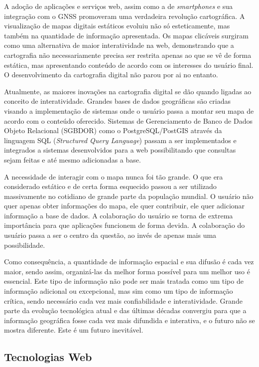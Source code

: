 		A adoção de aplicações e serviços web, assim como a de \textit{smartphones} e sua integração com o GNSS promoveram uma verdadeira revolução cartográfica. A visualização de mapas digitais estáticos evoluiu não só esteticamente, mas também na quantidade de informação apresentada. Os mapas clicáveis surgiram como uma alternativa de maior interatividade na web, demonstrando que a cartografia não necessariamente precisa ser restrita apenas ao que se vê de forma estática, mas apresentando conteúdo de acordo com os interesses do usuário final. O desenvolvimento da cartografia digital não parou por ai no entanto. 
		
		Atualmente, as maiores inovações na cartografia digital se dão quando ligadas ao conceito de interatividade. Grandes bases de dados geográficas são criadas visando a implementação de sistemas onde o usuário passa a montar seu mapa de acordo com o conteúdo oferecido. Sistemas de Gerenciamento de Banco de Dados Objeto Relacional (SGBDOR) como o PostgreSQL/PostGIS através da linguagem SQL (\textit{Structured Query Language}) passam a ser implementados e integrados a sistemas desenvolvidos para a web possibilitando que consultas sejam feitas e até mesmo adicionadas a base.
		
		A necessidade de interagir com o mapa nunca foi tão grande. O que era considerado estático e de certa forma esquecido passou a ser utilizado massivamente no cotidiano de grande parte da população mundial. O usuário não quer apenas obter informações do mapa, ele quer contribuir, ele quer adicionar informação a base de dados. A colaboração do usuário se torna de extrema importância para que aplicações funcionem de forma devida. A colaboração do usuário passa a ser o centro da questão, ao invés de apenas mais uma possibilidade.
		
		Como consequência, a quantidade de informação espacial e sua difusão é cada vez maior, sendo assim, organizá-las da melhor forma possível para um melhor uso é essencial. Este tipo de informação não pode ser mais tratada como um tipo de informação adicional ou excepcional, mas sim como um tipo de informação crítica, sendo necessário cada vez mais confiabilidade e interatividade. Grande parte da evolução tecnológica atual e das últimas décadas convergiu para que a informação geográfica fosse cada vez mais difundida e interativa, e o futuro não se mostra diferente. Este é um futuro inevitável. 
		
		\subsection{Tecnologias Web}
		
